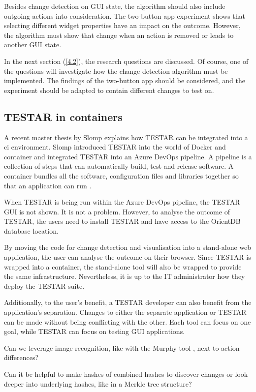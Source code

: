Besides change detection on GUI state, the algorithm should also include outgoing actions into consideration. The two-button app experiment shows that selecting different widget properties have an impact on the outcome. However, the algorithm must show that change when an action is removed or leads to another GUI state.   

In the next section (\ref{4.2}), the research questions are discussed. Of course, one of the questions will investigate how the change detection algorithm must be implemented. The findings of the two-button app should be considered, and the experiment should be adapted to contain different changes to test on. 

\subsection{TESTAR in containers}
A recent master thesis by Slomp explains how TESTAR can be integrated into a \acrfull{ci} environment. Slomp introduced TESTAR into the world of Docker and container and integrated TESTAR into an Azure DevOps pipeline. A pipeline is a collection of steps that can automatically build, test and release software. A container bundles all the software, configuration files and libraries together so that an application can run \cite{ms-container}. 

When TESTAR is being run within the Azure DevOps pipeline, the TESTAR GUI is not shown. It is not a problem. However, to analyse the outcome of TESTAR, the users need to install TESTAR and have access to the OrientDB database location. 

By moving the code for change detection and visualisation into a stand-alone web application, the user can analyse the outcome on their browser. Since TESTAR is wrapped into a container, the stand-alone tool will also be wrapped to provide the same infrastructure. Nevertheless, it is up to the IT administrator how they deploy the TESTAR suite. 

Additionally, to the user's benefit, a TESTAR developer can also benefit from the application's separation. Changes to either the separate application or TESTAR can be made without being conflicting with the other. Each tool can focus on one goal, while TESTAR can focus on testing GUI applications. 





Can we leverage image recognition, like with the Murphy tool \cite{murphy-extract-gui}, next to action differences? 

Can it be helpful to make hashes of combined hashes to discover changes or look deeper into underlying hashes, like in a Merkle tree \cite{merkle-tree} structure?